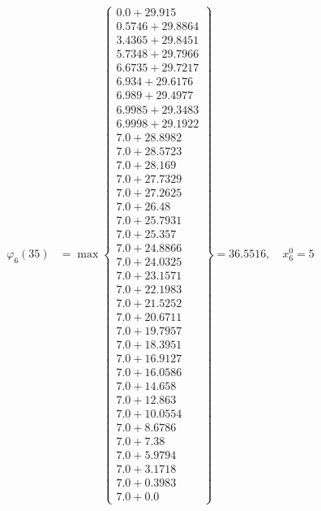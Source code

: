 \documentclass{article}
\begin{document}
\begin{align*}
  
\varphi_{6}(35) &= \max \left\{ \begin{array}{c}
0.0 + 29.915 \\
 0.5746 + 29.8864 \\
 3.4365 + 29.8451 \\
 5.7348 + 29.7966 \\
 6.6735 + 29.7217 \\
 6.934 + 29.6176 \\
 6.989 + 29.4977 \\
 6.9985 + 29.3483 \\
 6.9998 + 29.1922 \\
 7.0 + 28.8982 \\
 7.0 + 28.5723 \\
 7.0 + 28.169 \\
 7.0 + 27.7329 \\
 7.0 + 27.2625 \\
 7.0 + 26.48 \\
 7.0 + 25.7931 \\
 7.0 + 25.357 \\
 7.0 + 24.8866 \\
 7.0 + 24.0325 \\
 7.0 + 23.1571 \\
 7.0 + 22.1983 \\
 7.0 + 21.5252 \\
 7.0 + 20.6711 \\
 7.0 + 19.7957 \\
 7.0 + 18.3951 \\
 7.0 + 16.9127 \\
 7.0 + 16.0586 \\
 7.0 + 14.658 \\
 7.0 + 12.863 \\
 7.0 + 10.0554 \\
 7.0 + 8.6786 \\
 7.0 + 7.38 \\
 7.0 + 5.9794 \\
 7.0 + 3.1718 \\
 7.0 + 0.3983 \\
 7.0 + 0.0
\end{array} \right\}=36.5516,\quad x_{6}^0=5\\
  
  
  

\end{align*}
\end{document}
